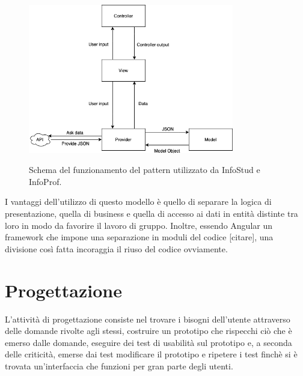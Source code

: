 \documentclass[Lau, oneside]{sapthesis}%
\begin{document}
\begin{figure}[h]
	\caption{Schema del funzionamento del pattern utilizzato da InfoStud e InfoProf.}
	\centering
	\includegraphics[width=0.8\textwidth]{arch-pattern-img}
	\label{fig:pattern}
\end{figure}

I vantaggi dell'utilizzo di questo modello è quello di separare la logica di presentazione, quella di business e quella di accesso ai dati
in entità distinte tra loro in modo da favorire il lavoro di gruppo. Inoltre, essendo Angular un framework che impone una separazione in moduli del codice [citare], una divisione
così fatta incoraggia il riuso del codice ovviamente. %



\chapter{Progettazione}
\label{ch:3}
L'attività di progettazione consiste nel trovare i bisogni dell'utente attraverso delle domande rivolte agli stessi, costruire un prototipo che rispecchi ciò che è emerso dalle domande, eseguire dei test di usabilità sul prototipo e, a seconda delle criticità, emerse dai test modificare il prototipo e ripetere i test finchè si è trovata un'interfaccia che funzioni per gran parte degli utenti.
\end{document}

